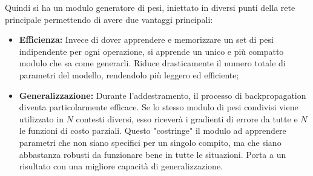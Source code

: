 Quindi si ha un modulo generatore di pesi, iniettato in diversi punti della rete principale permettendo di avere due vantaggi principali:

\begin{itemize}
    \item \textbf{Efficienza:} Invece di dover apprendere e memorizzare un set di pesi indipendente per ogni operazione, si apprende un unico e più compatto modulo che sa come generarli. Riduce drasticamente il numero totale di parametri del modello, rendendolo più leggero ed efficiente;
    \item \textbf{Generalizzazione:} Durante l'addestramento, il processo di backpropagation diventa particolarmente efficace. Se lo stesso modulo di pesi condivisi viene utilizzato in $N$ contesti diversi, esso riceverà i gradienti di errore da tutte e $N$ le funzioni di costo parziali. Questo "costringe" il modulo ad apprendere parametri che non siano specifici per un singolo compito, ma che siano abbastanza robusti da funzionare bene in tutte le situazioni. Porta a un risultato con una migliore capacità di generalizzazione.
\end{itemize}
